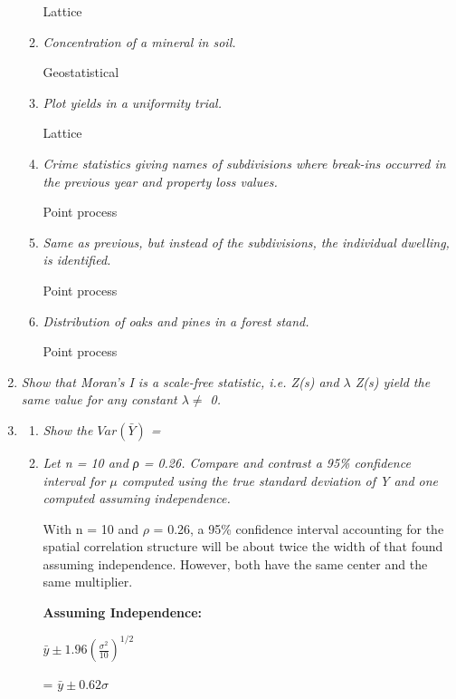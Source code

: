 \documentclass{article}\usepackage[]{graphicx}\usepackage[]{color}
\begin{document}
\begin{enumerate}
\begin{enumerate}
Lattice

\item %
{\it Concentration of a mineral in soil.}

Geostatistical

\item %
{\it Plot yields in a uniformity trial.}

Lattice

\item %
{\it Crime statistics giving names of subdivisions where break-ins occurred in the previous year and property loss values.}

Point process

\item %
{\it Same as previous, but instead of the subdivisions, the individual dwelling, is identified.}

Point process

\item %
{\it Distribution of oaks and pines in a forest stand.}

Point process
\end{enumerate}
\newpage

\item %
{\it Show that Moran’s I is a scale-free statistic, i.e. Z(s) and $\lambda$ Z(s) yield the same value for any constant $\lambda \neq$ 0.}
\vspace{4in}

\item %

\begin{enumerate}
\item %
{\it Show the $Var(\bar{Y})$ = }

\vspace{4in}

\item %
{\it Let n = 10 and ρ = 0.26. Compare and contrast a 95\% confidence interval for $\mu$ computed using the true standard deviation of Y and one computed assuming independence.}

With n = 10 and $\rho$ = 0.26, a 95\% confidence interval accounting for the spatial correlation structure will be about twice the width of that found assuming independence. However, both have the same center and the same multiplier.


{\bf Assuming Independence:}


$\bar{y} \pm 1.96(\frac{\sigma^{2}}{10})^{1/2}$


= $\bar{y} \pm 0.62\sigma$



\end{enumerate}
\end{enumerate}
\end{document}
